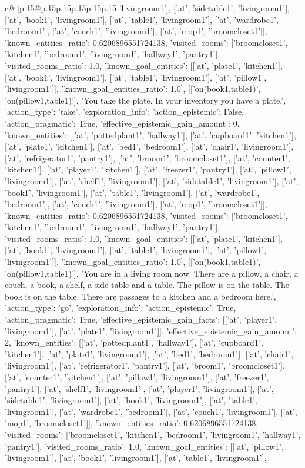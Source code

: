 \documentclass{article}
\begin{document}
{\begin{supertabular}{c@{$\;$}|p{.15\linewidth}@{}p{.15\linewidth}p{.15\linewidth}p{.15\linewidth}p{.15\linewidth}p{.15\linewidth}}
{{{'livingroom1'], ['at', 'sidetable1', 'livingroom1'], ['at', 'book1', 'livingroom1'], ['at', 'table1', 'livingroom1'], ['at', 'wardrobe1', 'bedroom1'], ['at', 'couch1', 'livingroom1'], ['at', 'mop1', 'broomcloset1']], 'known_entities_ratio': 0.6206896551724138, 'visited_rooms': ['broomcloset1', 'kitchen1', 'bedroom1', 'livingroom1', 'hallway1', 'pantry1'], 'visited_rooms_ratio': 1.0, 'known_goal_entities': [['at', 'plate1', 'kitchen1'], ['at', 'book1', 'livingroom1'], ['at', 'table1', 'livingroom1'], ['at', 'pillow1', 'livingroom1']], 'known_goal_entities_ratio': 1.0}}], [['on(book1,table1)', 'on(pillow1,table1)'], 'You take the plate. In your inventory you have a plate.', {'action_type': 'take', 'exploration_info': {'action_epistemic': False, 'action_pragmatic': True, 'effective_epistemic_gain_amount': 0, 'known_entities': [['at', 'pottedplant1', 'hallway1'], ['at', 'cupboard1', 'kitchen1'], ['at', 'plate1', 'kitchen1'], ['at', 'bed1', 'bedroom1'], ['at', 'chair1', 'livingroom1'], ['at', 'refrigerator1', 'pantry1'], ['at', 'broom1', 'broomcloset1'], ['at', 'counter1', 'kitchen1'], ['at', 'player1', 'kitchen1'], ['at', 'freezer1', 'pantry1'], ['at', 'pillow1', 'livingroom1'], ['at', 'shelf1', 'livingroom1'], ['at', 'sidetable1', 'livingroom1'], ['at', 'book1', 'livingroom1'], ['at', 'table1', 'livingroom1'], ['at', 'wardrobe1', 'bedroom1'], ['at', 'couch1', 'livingroom1'], ['at', 'mop1', 'broomcloset1']], 'known_entities_ratio': 0.6206896551724138, 'visited_rooms': ['broomcloset1', 'kitchen1', 'bedroom1', 'livingroom1', 'hallway1', 'pantry1'], 'visited_rooms_ratio': 1.0, 'known_goal_entities': [['at', 'plate1', 'kitchen1'], ['at', 'book1', 'livingroom1'], ['at', 'table1', 'livingroom1'], ['at', 'pillow1', 'livingroom1']], 'known_goal_entities_ratio': 1.0}}], [['on(book1,table1)', 'on(pillow1,table1)'], 'You are in a living room now. There are a pillow, a chair, a couch, a book, a shelf, a side table and a table. The pillow is on the table. The book is on the table. There are passages to a kitchen and a bedroom here.', {'action_type': 'go', 'exploration_info': {'action_epistemic': True, 'action_pragmatic': True, 'effective_epistemic_gain_facts': [['at', 'player1', 'livingroom1'], ['at', 'plate1', 'livingroom1']], 'effective_epistemic_gain_amount': 2, 'known_entities': [['at', 'pottedplant1', 'hallway1'], ['at', 'cupboard1', 'kitchen1'], ['at', 'plate1', 'livingroom1'], ['at', 'bed1', 'bedroom1'], ['at', 'chair1', 'livingroom1'], ['at', 'refrigerator1', 'pantry1'], ['at', 'broom1', 'broomcloset1'], ['at', 'counter1', 'kitchen1'], ['at', 'pillow1', 'livingroom1'], ['at', 'freezer1', 'pantry1'], ['at', 'shelf1', 'livingroom1'], ['at', 'player1', 'livingroom1'], ['at', 'sidetable1', 'livingroom1'], ['at', 'book1', 'livingroom1'], ['at', 'table1', 'livingroom1'], ['at', 'wardrobe1', 'bedroom1'], ['at', 'couch1', 'livingroom1'], ['at', 'mop1', 'broomcloset1']], 'known_entities_ratio': 0.6206896551724138, 'visited_rooms': ['broomcloset1', 'kitchen1', 'bedroom1', 'livingroom1', 'hallway1', 'pantry1'], 'visited_rooms_ratio': 1.0, 'known_goal_entities': [['at', 'pillow1', 'livingroom1'], ['at', 'book1', 'livingroom1'], ['at', 'table1', 'livingroom1'], }}}
\end{supertabular}}
\end{document}
